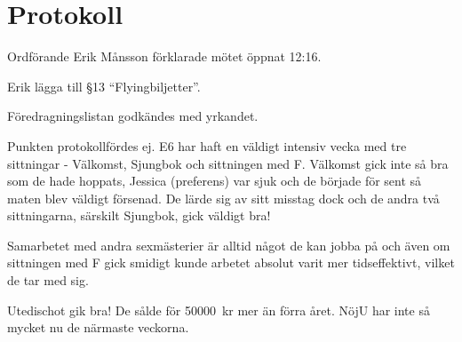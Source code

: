 \documentclass[10pt]{article}
\def\mo{Erik Månsson}
\begin{document}
\section*{Protokoll}
\begin{paragrafer}
Ordförande {\mo} förklarade mötet öppnat 12:16.

{\valavmo}

{\valavms}

{\valavj}

{\tosg}

{\ingaadj}


Erik \ypa lägga till \S13 ``Flyingbiljetter''.

Föredragningslistan godkändes med yrkandet.




\begin{fyllnadsval} %
\end{fyllnadsval}

\begin{paragrafer}
Punkten protokollfördes ej.
E6 har haft en väldigt intensiv vecka med tre sittningar - Välkomst, Sjungbok och sittningen med F. Välkomst gick inte så bra som de hade hoppats, Jessica (preferens) var sjuk och de började för sent så maten blev väldigt försenad. De lärde sig av sitt misstag dock och de andra två sittningarna, särskilt Sjungbok, gick väldigt bra!

Samarbetet med andra sexmästerier är alltid något de kan jobba på och även om sittningen med F gick smidigt kunde arbetet absolut varit mer tidseffektivt, vilket de tar med sig.

Utedischot gik bra! De sålde för \SI{50000}{kr} mer än förra året. NöjU har inte så mycket nu de närmaste veckorna.


\end{paragrafer}
\end{paragrafer}
\end{document}
